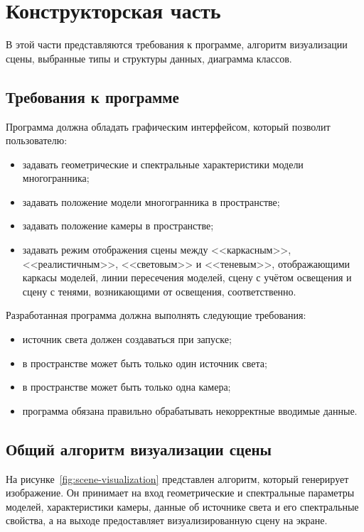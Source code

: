 \chapter{Конструкторская часть}

В этой части представляются требования к программе, алгоритм визуализации сцены, выбранные типы и структуры данных, диаграмма классов.

\section{Требования к программе}

Программа должна обладать графическим интерфейсом, который позволит пользователю:
\begin{itemize}[label=--]
	\item задавать геометрические и спектральные характеристики модели многогранника;
	\item задавать положение модели многогранника в пространстве;
	\item задавать положение камеры в пространстве;
	\item задавать режим отображения сцены между <<каркасным>>, <<реалистичным>>, <<световым>> и <<теневым>>, отображающими каркасы моделей, линии пересечения моделей, сцену с учётом освещения и сцену с тенями, возникающими от освещения, соответственно.
\end{itemize}

Разработанная программа должна выполнять следующие требования:
\begin{itemize}[label=--]
	\item источник света должен создаваться при запуске;
	\item в пространстве может быть только один источник света;
	\item в пространстве может быть только одна камера;
	\item программа обязана правильно обрабатывать некорректные вводимые данные.
\end{itemize}

\section{Общий алгоритм визуализации сцены}

На рисунке~\ref{fig:scene-visualization} представлен алгоритм, который генерирует изображение. Он принимает на вход геометрические и спектральные параметры моделей, характеристики камеры, данные об источнике света и его спектральные свойства, а на выходе предоставляет визуализированную сцену на экране.

